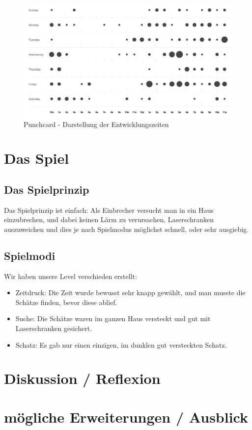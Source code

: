 \documentclass[12pt,a4paper]{scrartcl}
\begin{document}
\begin{figure}[h]
\centering
\includegraphics[scale=0.4]{img/punchcard.png}
\caption{Punchcard - Darstellung der Entwicklungszeiten}
\label{fig:punchcard}
\end{figure}

\section{Das Spiel}
\subsection{Das Spielprinzip}
Das Spielprinzip ist einfach: Als Einbrecher versucht man in ein Haus einzubrechen, und dabei keinen Lärm zu verursachen, Laserschranken auszuweichen
und dies je nach Spielmodus möglichst schnell, oder sehr ausgiebig.

\subsection{Spielmodi}
Wir haben unsere Level verschieden erstellt:
\begin{itemize}
\item Zeitdruck: Die Zeit wurde bewusst sehr knapp gewählt, und man musste die Schätze finden, bevor diese ablief.
\item Suche: Die Schätze waren im ganzen Haus versteckt und gut mit Laserschranken gesichert.
\item Schatz: Es gab nur einen einzigen, im dunklen gut versteckten Schatz.
\end{itemize}

\newpage
\section{Diskussion / Reflexion}

\newpage
\section{mögliche Erweiterungen / Ausblick}



\clearpage
\listoffigures
\end{document}
